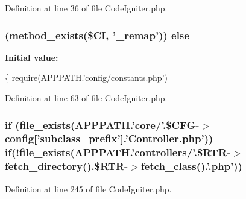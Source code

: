 Definition at line 36 of file Code\-Igniter.\-php.

\hypertarget{_code_igniter_8php_a92382071610da06a8cb62a44c4530e10}{
\subsubsection[{else}]{ (method\-\_\-exists(\$C\-I, '\-\_\-remap')) else}}\label{_code_igniter_8php_a92382071610da06a8cb62a44c4530e10}
{\bfseries Initial value\-:}
\begin{DoxyCode}
\{
        require(APPPATH.\textcolor{stringliteral}{'config/constants.php'})
\end{DoxyCode}


Definition at line 63 of file Code\-Igniter.\-php.

\hypertarget{_code_igniter_8php_a8d119d888af4f356541728c61143967b}{
\subsubsection[{if}]{\setlength{\rightskip}{0pt plus 5cm}if (file\-\_\-exists(A\-P\-P\-P\-A\-T\-H.'core/'.\$C\-F\-G-\/$>$config\mbox{[}'subclass\-\_\-prefix'\mbox{]}.'Controller.\-php')) if(!file\-\_\-exists(A\-P\-P\-P\-A\-T\-H.'controllers/'.\$R\-T\-R-\/$>$fetch\-\_\-directory().\$R\-T\-R-\/$>$fetch\-\_\-class().'.php'))}}\label{_code_igniter_8php_a8d119d888af4f356541728c61143967b}


Definition at line 245 of file Code\-Igniter.\-php.

